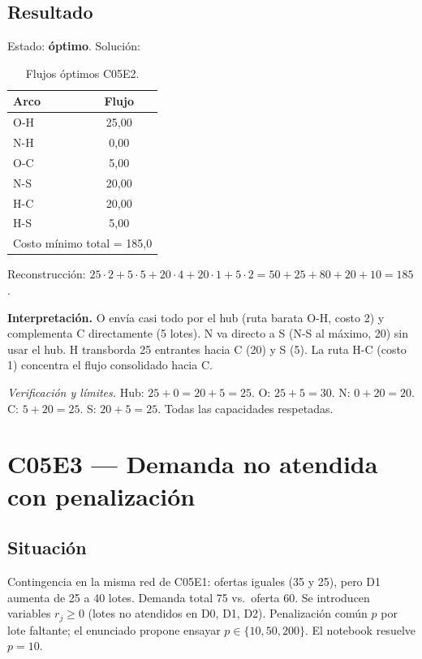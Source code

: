 \documentclass[11pt,a4paper]{article}
\newcommand{\interpretacion}[1]{\noindent\textbf{Interpretación.} #1\par}
\newcommand{\verif}[1]{\noindent\small\textit{Verificación y límites.} #1\par}
\begin{document}
\subsection*{Resultado}
Estado: \textbf{óptimo}. Solución:
\begin{table}[H]
\centering
\small
\caption{Flujos óptimos C05E2.}
\begin{tabular}{@{}lc@{}}
\toprule
Arco & Flujo \\
\midrule
O-H & 25{,}00 \\
N-H & 0{,}00 \\
O-C & 5{,}00 \\
N-S & 20{,}00 \\
H-C & 20{,}00 \\
H-S & 5{,}00 \\
\midrule
\multicolumn{2}{l}{Costo mínimo total = 185{,}0} \\
\bottomrule
\end{tabular}
\end{table}

Reconstrucción: $25{\cdot}2 + 5{\cdot}5 + 20{\cdot}4 + 20{\cdot}1 + 5{\cdot}2 = 50 + 25 + 80 + 20 + 10 = 185$.

\interpretacion{O envía casi todo por el hub (ruta barata O-H, costo 2) y complementa C directamente (5 lotes). N va directo a S (N-S al máximo, 20) sin usar el hub. H transborda 25 entrantes hacia C (20) y S (5). La ruta H-C (costo 1) concentra el flujo consolidado hacia C.}

\verif{Hub: $25+0=20+5=25$. O: $25+5=30$. N: $0+20=20$. C: $5+20=25$. S: $20+5=25$. Todas las capacidades respetadas.}

\section{C05E3 --- Demanda no atendida con penalización}

\subsection*{Situación}
Contingencia en la misma red de C05E1: ofertas iguales (35 y 25), pero D1 aumenta de 25 a 40 lotes. Demanda total 75 vs.\ oferta 60. Se introducen variables $r_j\ge 0$ (lotes no atendidos en D0, D1, D2). Penalización común $p$ por lote faltante; el enunciado propone ensayar $p\in\{10,50,200\}$. El notebook resuelve $p=10$.
\end{document}
